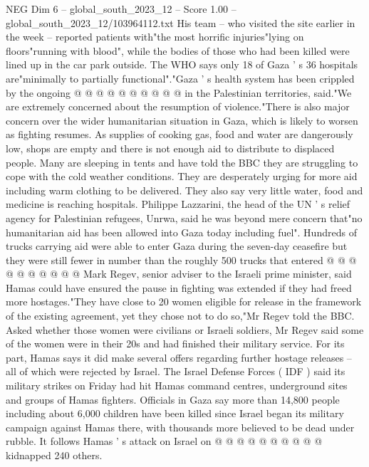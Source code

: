 \begin{textsample}{NEG Dim 6 – global\_south\_2023\_12 – Score 1.00 – global\_south\_2023\_12/103964112.txt}
His team -- who visited the site earlier in the week -- reported patients with"the most horrific injuries"lying on floors"running with blood", while the bodies of those who had been killed were lined up in the car park outside.
The WHO says only 18 of Gaza ' s 36 hospitals are"minimally to partially functional"."Gaza ' s health system has been crippled by the ongoing @ @ @ @ @ @ @ @ @ @ in the Palestinian territories, said."We are extremely concerned about the resumption of violence."There is also major concern over the wider humanitarian situation in Gaza, which is likely to worsen as fighting resumes.
As supplies of cooking gas, food and water are dangerously low, shops are empty and there is not enough aid to distribute to displaced people.
Many are sleeping in tents and have told the BBC they are struggling to cope with the cold weather conditions.
They are desperately urging for more aid including warm clothing to be delivered.
They also say very little water, food and medicine is reaching hospitals.
Philippe Lazzarini, the head of the UN ' s relief agency for Palestinian refugees, Unrwa, said he was beyond mere concern that"no humanitarian aid has been allowed into Gaza today including fuel".
Hundreds of trucks carrying aid were able to enter Gaza during the seven-day ceasefire but they were still fewer in number than the roughly 500 trucks that entered @ @ @ @ @ @ @ @ @ @ Mark Regev, senior adviser to the Israeli prime minister, said Hamas could have ensured the pause in fighting was extended if they had freed more hostages."They have close to 20 women eligible for release in the framework of the existing agreement, yet they chose not to do so,"Mr Regev told the BBC.
Asked whether those women were civilians or Israeli soldiers, Mr Regev said some of the women were in their 20s and had finished their military service.
For its part, Hamas says it did make several offers regarding further hostage releases -- all of which were rejected by Israel.
The Israel Defense Forces ( IDF ) said its military strikes on Friday had hit Hamas command centres, underground sites and groups of Hamas fighters.
Officials in Gaza say more than 14,800 people including about 6,000 children have been killed since Israel began its military campaign against Hamas there, with thousands more believed to be dead under rubble.
It follows Hamas ' s attack on Israel on @ @ @ @ @ @ @ @ @ @ kidnapped 240 others.

\end{textsample}
